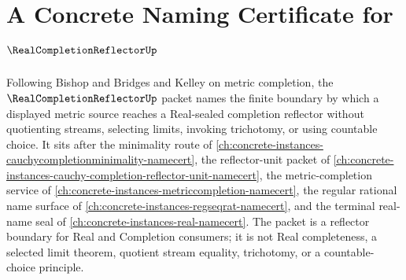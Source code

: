 \chapter{A Concrete Naming Certificate for $\RealCompletionReflectorUp$}
\label{ch:concrete-instances-real-completion-reflector-namecert}

Following Bishop and Bridges and Kelley on metric completion, the $\RealCompletionReflectorUp$ packet names the finite boundary by which a displayed metric source reaches a Real-sealed completion reflector without quotienting streams, selecting limits, invoking trichotomy, or using countable choice. It sits after the minimality route of \autoref{ch:concrete-instances-cauchycompletionminimality-namecert}, the reflector-unit packet of \autoref{ch:concrete-instances-cauchy-completion-reflector-unit-namecert}, the metric-completion service of \autoref{ch:concrete-instances-metriccompletion-namecert}, the regular rational name surface of \autoref{ch:concrete-instances-regseqrat-namecert}, and the terminal real-name seal of \autoref{ch:concrete-instances-real-namecert}. The packet is a reflector boundary for Real and Completion consumers; it is not Real completeness, a selected limit theorem, quotient stream equality, trichotomy, or a countable-choice principle.

